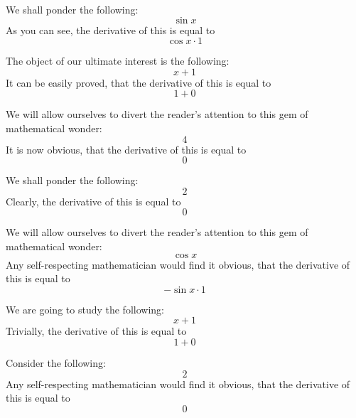 \documentclass{article}
\begin{document}
We shall ponder the following:
\begin{equation}
\sin x 
\end{equation}
As you can see, the derivative of this is equal to
\begin{equation}
\cos x \cdot 1 
\end{equation}

The object of our ultimate interest is the following:
\begin{equation}
x + 1 
\end{equation}
It can be easily proved, that the derivative of this is equal to
\begin{equation}
1 + 0 
\end{equation}

We will allow ourselves to divert the reader's attention to this gem of mathematical wonder:
\begin{equation}
4 
\end{equation}
It is now obvious, that the derivative of this is equal to
\begin{equation}
0 
\end{equation}

We shall ponder the following:
\begin{equation}
2 
\end{equation}
Clearly, the derivative of this is equal to
\begin{equation}
0 
\end{equation}

We will allow ourselves to divert the reader's attention to this gem of mathematical wonder:
\begin{equation}
\cos x 
\end{equation}
Any self-respecting mathematician would find it obvious, that the derivative of this is equal to
\begin{equation}
-\sin x \cdot 1 
\end{equation}

We are going to study the following:
\begin{equation}
x + 1 
\end{equation}
Trivially, the derivative of this is equal to
\begin{equation}
1 + 0 
\end{equation}

Consider the following:
\begin{equation}
2 
\end{equation}
Any self-respecting mathematician would find it obvious, that the derivative of this is equal to
\begin{equation}
0 
\end{equation}
\end{document}
